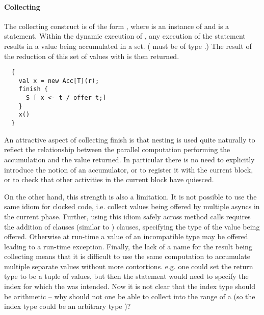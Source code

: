 
\paragraph{Collecting }

The collecting  construct is of the form , where  is an instance of  and
 is a statement. Within the dynamic execution of , any
execution of the statement  results in a value 
being accumulated in a set. ( must be of type .) The
result of the reduction of this set of  values with 
is then returned.

\begin{lstlisting}
  {
    val x = new Acc[T](r);
    finish {
      S [ x <- t / offer t;]
    }
    x()
  }
\end{lstlisting}

An attractive aspect of collecting finish is that nesting is used
quite naturally to reflect the relationship between the parallel
computation performing the accumulation and the value returned. In
particular there is no need to explicitly introduce the notion of an
accumulator, or to register it with the current block, or to check
that other activities in the current block have quiesced.

On the other hand, this strength is also a limitation. It is not
possible to use the same idiom for clocked code, i.e.{} collect values
being offered by multiple  asyncs in the current phase.
Further, using this idiom safely across method calls requires the
addition of  clauses (similar to )
clauses, specifying the type of the value being offered. Otherwise at
run-time a value of an incompatible type may be offered leading to a
run-time exception. Finally, the lack of a name for the result being
collecting means that it is difficult to use the same computation to
accumulate multiple separate values without more contortions. e.g.{}
one could set the return type to be a tuple of values, but then the
 statement would need to specify the index for which the
 was intended. Now it is not clear that the index type
should be arithmetic -- why should not one be able to collect into the
range of a  (so the index type could be an arbitrary
type )?

